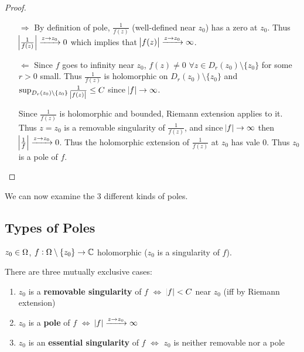 \begin{proof}
\begin{enumerate}
    \item[$\Rightarrow$] By definition of pole, $\frac{1}{f(z)}$ (well-defined near $z_0$) has a zero at $z_0$. Thus $\abs{\frac{1}{f(z)}} \xrightarrow[]{z\to z_0}0$ which implies that $\abs{f(z)} \xrightarrow[]{z\to z_0} \infty$.
    
    \item[$\Leftarrow$] Since $f$ goes to infinity near $z_0$, $f(z) \neq 0$ $ \forall z \in D_r(z_0) \setminus \{ z_0 \}$ for some $r>0$ small. Thus $\frac{1}{f(z)}$ is holomorphic on $D_r(z_0) \setminus \{ z_0 \}$ and $\sup_{D_r(z_0) \setminus \{ z_0 \}} \frac{1}{\abs{f(z)}} \leq C$ since $\abs{f} \to \infty$.
    
    Since $\frac{1}{f(z)}$ is holomorphic and bounded, Riemann extension applies to it. Thus $z=z_0$ is a removable singularity of $\frac{1}{f(z)}$, and since $\abs{f} \to \infty$ then $\abs{\frac{1}{f}} \xrightarrow[]{z\to z_0} 0$. Thus the holomorphic extension of $\frac{1}{f(z)}$ at $z_0$ has vale 0. Thus $z_0$ is a pole of $f$.
\end{enumerate}
\end{proof}

We can now examine the 3 different kinds of poles.

\subsection{Types of Poles}

\begin{definition}
$z_0 \in \Omega$, $f: \Omega \setminus \{ z_0 \} \to \mathbb{C}$ holomorphic ($z_0$ is a singularity of $f$).

There are three mutually exclusive cases:

\begin{enumerate}
    \item $z_0$ is a \textbf{removable singularity} of $f$ $\iff$ $\abs{f} < C$ near $z_0$ (iff by Riemann extension)
    
    \item $z_0$ is a \textbf{pole} of $f$ $\iff$ $\abs{f} \xrightarrow[]{z\to z_0} \infty$
    
    \item $z_0$ is an \textbf{essential singularity} of $f$ $\iff$ $z_0$ is neither removable nor a pole
\end{enumerate}
\end{definition}

